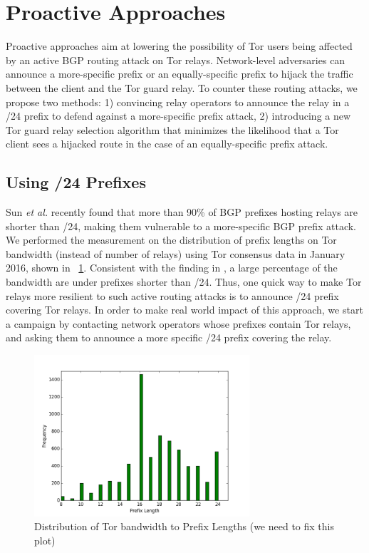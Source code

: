 \section{Proactive Approaches}
Proactive approaches aim at lowering the possibility of Tor users being affected by an active BGP routing attack on Tor relays. Network-level adversaries can announce a more-specific prefix or an equally-specific prefix to hijack the traffic between the client and the Tor guard relay. To counter these routing attacks, we propose two methods: 1) convincing relay operators to announce the relay in a /24 prefix to defend against a more-specific prefix attack, 2) introducing a new Tor guard relay selection algorithm that minimizes the likelihood that a Tor client sees a hijacked route in the case of an equally-specific prefix attack.

\subsection{Using /24 Prefixes}
\label{subsec:24prefix}

Sun \emph{et al.} \cite{sun2015raptor} recently found that more than 90\% of BGP prefixes hosting relays are
shorter than /24, making them vulnerable to a more-specific BGP prefix attack. We performed the measurement on the distribution of prefix lengths on Tor bandwidth (instead of number of relays) using Tor consensus data in January 2016, shown in ~\ref{fig_prefixlen}. Consistent with the finding in \cite{sun2015raptor}, a large percentage of the bandwidth are under prefixes shorter than /24. Thus, one quick way to make Tor relays more resilient to such active routing attacks is to announce /24 prefix covering Tor relays. In order to make real world impact of this approach, we start a campaign by contacting network operators whose prefixes contain Tor relays, and asking them to announce a more specific /24 prefix covering the relay. 

\begin{figure}[ht!]
\centering
\includegraphics[width=80mm]{prefix_len_graph}
\caption{Distribution of Tor bandwidth to Prefix Lengths (we need to fix this plot) \label{fig_prefixlen}}
\end{figure}

